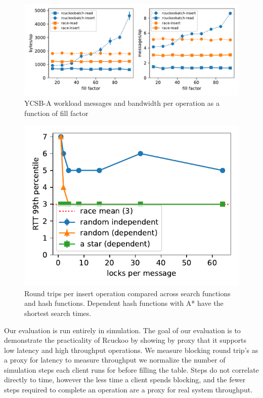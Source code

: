 \begin{figure}[ht]
    \includegraphics[width=0.99\linewidth]{fig/hero_ycsb_fill_ops_bw.pdf}
    \caption{YCSB-A workload messages and bandwidth per operation as a function of fill factor}
    \label{fig:ycsb_fill_latency}
\end{figure}

\begin{figure}[ht]
    \includegraphics[width=0.99\linewidth]{fig/search_dependence.pdf}

    \caption{Round trips per insert operation compared
    across search functions and hash functions. Dependent
    hash functions with A* have the shortest search times.}

    \label{fig:search_dependence}
\end{figure}

Our evaluation is run entirely in simulation. The goal of
our evaluation is to demonstrate the practicality of Rcuckoo
by showing by proxy that it supports low latency and high
throughput operations. We measure blocking round trip's as a
proxy for latency to measure throughput we normalize the
number of simulation steps each client runs for before
filling the table. Steps do not correlate directly to time,
however the less time a client spends blocking, and the
fewer steps required to complete an operation are a proxy
for real system throughput.


